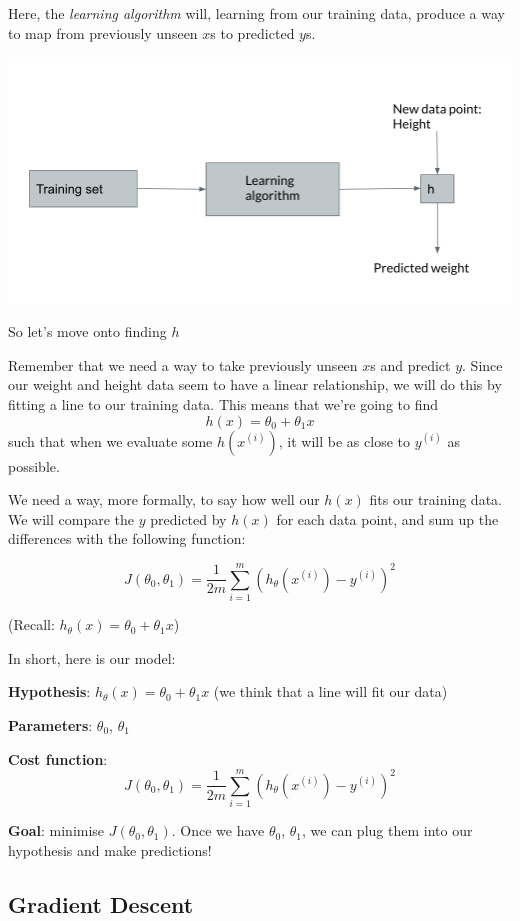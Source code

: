 \documentclass[12pt]{article}
\begin{document}
Here, the \textit{learning algorithm} will, learning from our training data, produce a way to map from previously unseen $x$s to predicted $y$s.


\includegraphics[width={\textwidth}]{the-model}


So let's move onto finding $h$

Remember that we need a way to take previously unseen $x$s and predict $y$. Since our weight and height data seem to have a linear relationship, we will do this by fitting a line to our training data. This means that we're going to find \[h(x) = \theta_0 + \theta_1x\] such that when we evaluate some $h(x^{(i)})$, it will be as close to $y^{(i)}$ as possible. 

We need a way, more formally, to say how well our $h(x)$ fits our training data. We will compare the $y$ predicted by $h(x)$ for each data point, and sum up the differences with the following function:

\[J(\theta_0, \theta_1) = \frac{1}{2m} \sum^m_{i=1}(h_\theta(x^{(i)}) - y^{(i)})^2\]

(Recall: $h_\theta(x) = \theta_0 + \theta_1x$)

In short, here is our model:

\textbf{Hypothesis}: $h_\theta(x) = \theta_0 + \theta_1x$ (we think that a line will fit our data)

\textbf{Parameters}: $\theta_0$, $\theta_1$

\textbf{Cost function}: \[J(\theta_0, \theta_1) = \frac{1}{2m} \sum^m_{i=1}(h_\theta(x^{(i)}) - y^{(i)})^2\]

\textbf{Goal}: minimise $J(\theta_0, \theta_1)$. Once we have $\theta_0$, $\theta_1$, we can plug them into our hypothesis and make predictions! 

\subsection{Gradient Descent}
\end{document}
